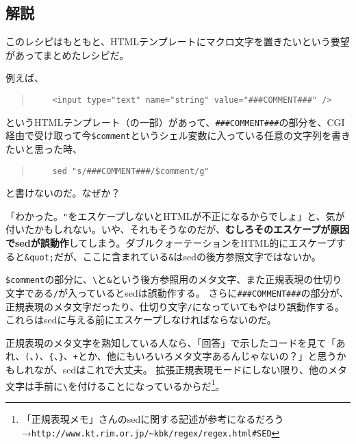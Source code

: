 \subsection*{解説}

このレシピはもともと、HTMLテンプレートにマクロ文字を置きたいという要望があってまとめたレシピだ。

例えば、

\begin{quote}
\begin{verbatim}
	<input type="text" name="string" value="###COMMENT###" />
\end{verbatim}
\end{quote}

というHTMLテンプレート（の一部）があって、\verb|###COMMENT###|の部分を、CGI経由で受け取って今\verb|$comment|というシェル変数に入っている任意の文字列を書きたいと思った時、

\begin{quote}
\begin{verbatim}
	sed "s/###COMMENT###/$comment/g"
\end{verbatim}
\end{quote}

と書けないのだ。なぜか？

「わかった。\verb|"|をエスケープしないとHTMLが不正になるからでしょ」と、気が付いたかもしれない。いや、それもそうなのだが、\textbf{むしろそのエスケープが原因でsedが誤動作}してしまう。ダブルクォーテーションをHTML的にエスケープすると\verb|&quot;|だが、ここに含まれている\verb|&|はsedの後方参照文字ではないか。

\verb|$comment|の部分に、\verb|\|と\verb|&|という後方参照用のメタ文字、また正規表現の仕切り文字である\verb|/|が入っているとsedは誤動作する。
さらに\verb|###COMMENT###|の部分が、正規表現のメタ文字だったり、仕切り文字\verb|/|になっていてもやはり誤動作する。これらはsedに与える前にエスケープしなければならないのだ。

正規表現のメタ文字を熟知している人なら、「回答」で示したコードを見て「あれ、\verb|(|、\verb|)|、\verb|{|、\verb|}|、\verb|+|とか、他にもいろいろメタ文字あるんじゃないの？」と思うかもしれなが、sedはこれで大丈夫。
拡張正規表現モードにしない限り、他のメタ文字は手前に\verb|\|を付けることになっているからだ\footnote{「正規表現メモ」さんのsedに関する記述が参考になるだろう→\verb|http://www.kt.rim.or.jp/~kbk/regex/regex.html#SED|}。
